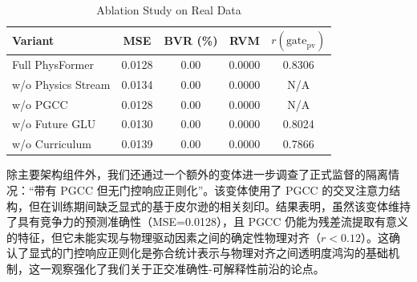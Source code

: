 \begin{table}[htbp]
\centering
\caption{Ablation Study on Real Data}
\label{tab:ablation}
\footnotesize
\setlength{\tabcolsep}{3pt}
\begin{tabular*}{\columnwidth}{@{\extracolsep{\fill}}lcccc@{}}
\toprule
Variant & MSE & BVR (\%) & RVM & $r(\text{gate}_{\text{pv}})$ \\
\midrule
Full PhysFormer & 0.0128 & 0.00 & 0.0000 & 0.8306 \\
w/o Physics Stream & 0.0134 & 0.00 & 0.0000 & N/A \\
w/o PGCC & 0.0128 & 0.00 & 0.0000 & N/A \\
w/o Future GLU & 0.0130 & 0.00 & 0.0000 & 0.8024 \\
w/o Curriculum & 0.0139 & 0.00 & 0.0000 & 0.7866 \\
\bottomrule
\end{tabular*}
\end{table}

除主要架构组件外，我们还通过一个额外的变体进一步调查了正式监督的隔离情况：“带有 PGCC 但无门控响应正则化”。该变体使用了 PGCC 的交叉注意力结构，但在训练期间缺乏显式的基于皮尔逊的相关刻印。结果表明，虽然该变体维持了具有竞争力的预测准确性（MSE=0.0128），且 PGCC 仍能为残差流提取有意义的特征，但它未能实现与物理驱动因素之间的确定性物理对齐（$r < 0.12$）。这确认了显式的门控响应正则化是弥合统计表示与物理对齐之间透明度鸿沟的基础机制，这一观察强化了我们关于正交准确性-可解释性前沿的论点。
